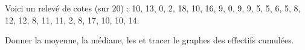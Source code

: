 
\begin{exercice}\label{exoSeconde-0027}

    Voici un relevé de cotes (sur \( 20\)) : 10, 13, 0, 2, 18, 10, 16, 9, 0, 9, 9, 5, 5, 6, 5, 8, 12, 12, 8, 11, 11, 2, 8, 17, 10, 10, 14.

    Donner la moyenne, la médiane, les  et tracer le graphes des effectifs cumulées.

\end{exercice}
